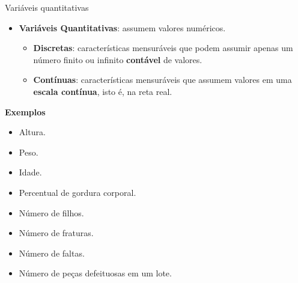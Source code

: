 \documentclass[
  ignorenonframetext,
  serif,
  professionalfont,
  usenames,
  dvipsnames,
  aspectratio = 169]{beamer}
\providecommand{\tightlist}{%
  \setlength{\itemsep}{0pt}\setlength{\parskip}{0pt}}
\renewcommand{\tightlist}{%
  \setlength{\itemsep}{0\baselineskip}
  \setlength{\parskip}{0.25\baselineskip}
}
\def\beginAHalfColumn{\begin{minipage}{0.49\textwidth}}%
\def\endColumns{\end{minipage}}%
\begin{document}
\begin{frame}{Variáveis quantitativas}
\label{variuxe1veis-quantitativas}
\beginAHalfColumn

\begin{itemize}
\tightlist
\item
  \textbf{Variáveis Quantitativas}: assumem valores numéricos.

  \begin{itemize}
  \tightlist
  \item
    \textbf{Discretas}: características mensuráveis que podem assumir
    apenas um número finito ou infinito \textbf{contável} de valores.
  \item
    \textbf{Contínuas}: características mensuráveis que assumem valores
    em uma \textbf{escala contínua}, isto é, na reta real.
  \end{itemize}
\end{itemize}

\endColumns
\beginAHalfColumn

\textbf{Exemplos}

\begin{itemize}
\tightlist
\item
  Altura.
\item
  Peso.
\item
  Idade.
\item
  Percentual de gordura corporal.
\item
  Número de filhos.
\item
  Número de fraturas.
\item
  Número de faltas.
\item
  Número de peças defeituosas em um lote.
\end{itemize}

\endColumns
\end{frame}
\end{document}

